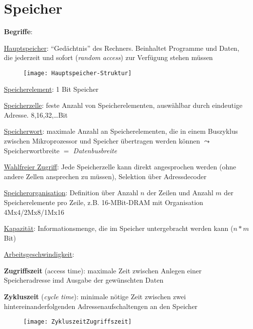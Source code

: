 \section{Speicher}
\label{sec:speicher}

\textbf{Begriffe}:
\begin{items}
	\item \underline{Hauptspeicher}: "`Gedächtnis"' des Rechners. Beinhaltet Programme und Daten, die jederzeit und sofort (\emph{random access}) zur Verfügung stehen müssen
	\begin{figure}[H]\centering\label{Hauptspeicher-Struktur}\texttt{[image: Hauptspeicher-Struktur]}\end{figure}

	\item \underline{Speicherelement}: 1 Bit Speicher

	\item \underline{Speicherzelle}: feste Anzahl von Speicherelementen, auswählbar durch eindeutige Adresse. 8,16,32,\dots Bit

	\item \underline{Speicherwort}: maximale Anzahl an Speicherelementen, die in einem Buszyklus zwischen Mikroprozessor und Speicher übertragen werden können \( \leadsto \) Speicherwortbreite \( = \) \emph{Datenbusbreite}

	\item \underline{Wahlfreier Zugriff}: Jede Speicherzelle kann direkt angesprochen werden (ohne andere Zellen ansprechen zu müssen), Selektion über Adressdecoder

	\item \underline{Speicherorganisation}: Definition über Anzahl \( n \) der Zeilen und Anzahl \( m \) der Speicherelemente pro Zeile, z.B. 16-MBit-DRAM mit Organisation 4Mx4/2Mx8/1Mx16

	\item \underline{Kapazität}: Informationsmenge, die im Speicher untergebracht werden kann (\( n*m \) Bit)

	\item \underline{Arbeitsgeschwindigkeit}:
	\begin{enumeration}
		\item \textbf{Zugriffszeit} (\emph{}access time): maximale Zeit zwischen Anlegen einer Speicheradresse imd Ausgabe der gewünschten Daten

		\item \textbf{Zykluszeit} (\emph{cycle time}): minimale nötige Zeit zwischen zwei hintereinanderfolgenden Adressenaufschaltengen an den Speicher

		\begin{figure}[H]\centering\label{ZykluszeitZugriffszeit}\texttt{[image: ZykluszeitZugriffszeit]}\end{figure}
	\end{enumeration}
\end{items}

